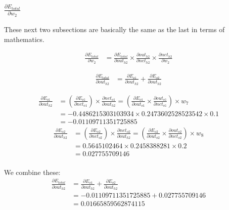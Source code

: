 \documentclass{article}
\begin{document}
\subsubsection{$\frac{\partial E_{total}}{\partial w_2}$}
These next two subsections are basically the same as the last in terms of 
mathematics.

\begin{align*} \frac{\partial E_{total}}{\partial w_2} & =
    \frac{\partial E_{total}}{\partial out_{h2}} \times
    \frac{\partial out_{h2}}{\partial net_{h2}} \times
    \frac{\partial net_{h2}}{\partial w_2}
\end{align*}

\begin{align*}
    \frac{\partial E_{total}}{\partial out_{h2}} & = 
    \frac{\partial E_{o1}}{\partial out_{h2}} +
    \frac{\partial E_{o2}}{\partial out_{h2}}
\end{align*}

\begin{align*}
    \frac{\partial E_{o1}}{\partial out_{h2}} & =
    (\frac{\partial E_{o1}}{\partial net_{o1}}) \times
    \frac{\partial net_{o1}}{\partial out_{h2}}
    = (\frac{\partial E_{o1}}{\partial out_{o1}} \times
        \frac{\partial out_{o1}}{\partial net_{o1}} ) \times w_7 \\
    & = -0.4486215303103934 \times 0.2473602528523542 \times 0.1 \\
    & = -0.01109711351725885
\end{align*}
\begin{align*}
    \frac{\partial E_{o2}}{\partial out_{h2}} & =
    (\frac{\partial E_{o2}}{\partial net_{o2}}) \times
    \frac{\partial net_{o2}}{\partial out_{h2}} 
    = (\frac{\partial E_{o2}}{\partial out_{o2}} \times
        \frac{\partial out_{o2}}{\partial net_{o2}} ) \times w_8 \\
    &= 0.5645102464 \times 0.2458388281 \times 0.2 \\
    & = 0.027755709146 \\
\end{align*}

We combine these:
\begin{align*}
    \frac{\partial E_{total}}{\partial out_{h2}} & = 
    \frac{\partial E_{o1}}{\partial out_{h2}} +
    \frac{\partial E_{o2}}{\partial out_{h2}} \\
    & = -0.01109711351725885 + 0.027755709146 \\
    &= 0.01665859562874115
\end{align*}
\end{document}

